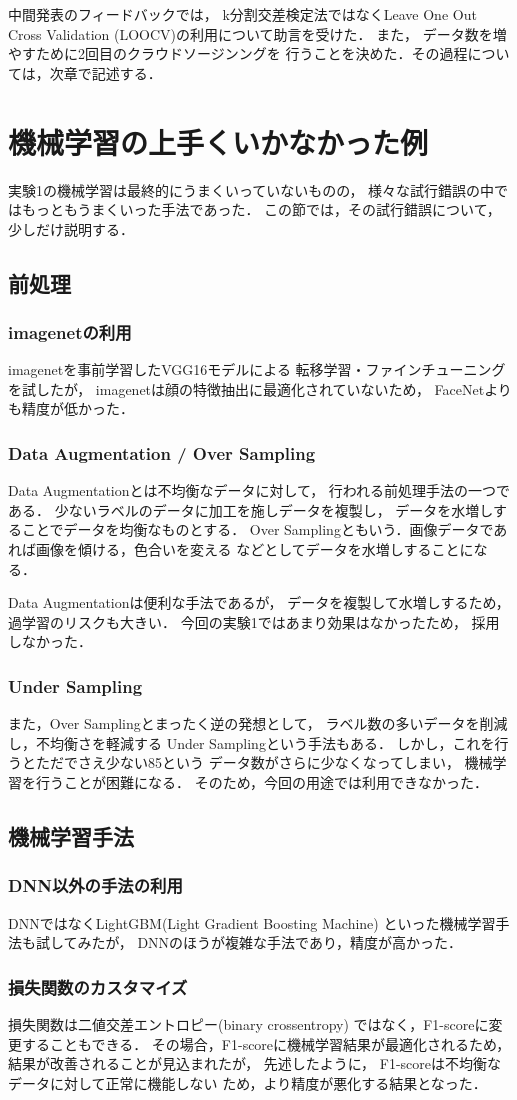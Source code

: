 中間発表のフィードバックでは，
k分割交差検定法ではなくLeave One Out Cross Validation
(LOOCV)の利用について助言を受けた．
また，
データ数を増やすために2回目のクラウドソージンングを
行うことを決めた．その過程については，次章で記述する．
\section{機械学習の上手くいかなかった例}
実験1の機械学習は最終的にうまくいっていないものの，
様々な試行錯誤の中ではもっともうまくいった手法であった．
この節では，その試行錯誤について，少しだけ説明する．

\subsection{前処理}
\subsubsection{imagenetの利用}
imagenetを事前学習したVGG16モデルによる
転移学習・ファインチューニングを試したが，
imagenetは顔の特徴抽出に最適化されていないため，
FaceNetよりも精度が低かった．
\subsubsection{Data Augmentation / Over Sampling}
Data Augmentationとは不均衡なデータに対して，
行われる前処理手法の一つである．
少ないラベルのデータに加工を施しデータを複製し，
データを水増しすることでデータを均衡なものとする．
Over Samplingともいう．画像データであれば画像を傾ける，色合いを変える
などとしてデータを水増しすることになる．

Data Augmentationは便利な手法であるが，
データを複製して水増しするため，過学習のリスクも大きい．
今回の実験1ではあまり効果はなかったため，
採用しなかった．
\subsubsection{Under Sampling}
また，Over Samplingとまったく逆の発想として，
ラベル数の多いデータを削減し，不均衡さを軽減する
Under Samplingという手法もある．
しかし，これを行うとただでさえ少ない85という
データ数がさらに少なくなってしまい，
機械学習を行うことが困難になる．
そのため，今回の用途では利用できなかった．
\subsection{機械学習手法}
\subsubsection{DNN以外の手法の利用}
DNNではなくLightGBM(Light Gradient Boosting Machine)
といった機械学習手法も試してみたが，
DNNのほうが複雑な手法であり，精度が高かった．
\subsubsection{損失関数のカスタマイズ}
損失関数は二値交差エントロピー(binary crossentropy)
ではなく，F1-scoreに変更することもできる．
その場合，F1-scoreに機械学習結果が最適化されるため，
結果が改善されることが見込まれたが，
先述したように，
F1-scoreは不均衡なデータに対して正常に機能しない
ため，より精度が悪化する結果となった．